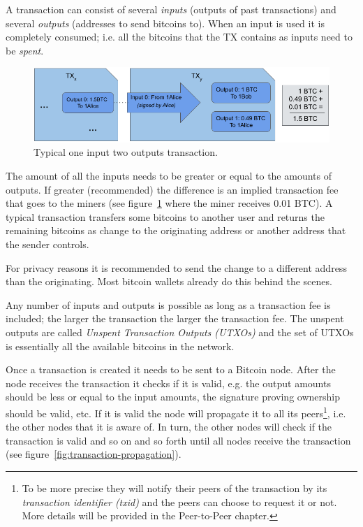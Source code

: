 A transaction can consist of several \emph{inputs} (outputs of past transactions) and several \emph{outputs} (addresses to send bitcoins to). When an input is used it is completely consumed; i.e. all the bitcoins that the TX contains as inputs need to be \emph{spent}.

\begin{figure}[h]
\begin{center}
\includegraphics[scale=0.5]{images/typical-transaction}
\caption{Typical one input two outputs transaction.}
\label{fig:typical-transaction}
\end{center}
\end{figure}

The amount of all the inputs needs to be greater or equal to the amounts of outputs. If greater (recommended) the difference is an implied transaction fee that goes to the miners (see figure~\ref{fig:typical-transaction} where the miner receives 0.01 BTC). A typical transaction transfers some bitcoins to another user and returns the remaining bitcoins as change to the originating address or another address that the sender controls.

\begin{note}
For privacy reasons it is recommended to send the change to a different address than the originating. Most bitcoin wallets already do this behind the scenes.
\end{note}

Any number of inputs and outputs is possible as long as a transaction fee is included; the larger the transaction the larger the transaction fee. The unspent outputs are called \emph{Unspent Transaction Outputs (UTXOs)} and the set of UTXOs is essentially all the available bitcoins in the network.

Once a transaction is created it needs to be sent to a Bitcoin node. After the node receives the transaction it checks if it is valid, e.g. the output amounts should be less or equal to the input amounts, the signature proving ownership should be valid, etc. If it is valid the node will propagate it to all its peers\footnote{To be more precise they will notify their peers of the transaction by its \emph{transaction identifier (txid)} and the peers can choose to request it or not. More details will be provided in the Peer-to-Peer chapter.}, i.e. the other nodes that it is aware of. In turn, the other nodes will check if the transaction is valid and so on and so forth until all nodes receive the transaction (see figure~\ref{fig:transaction-propagation}).


